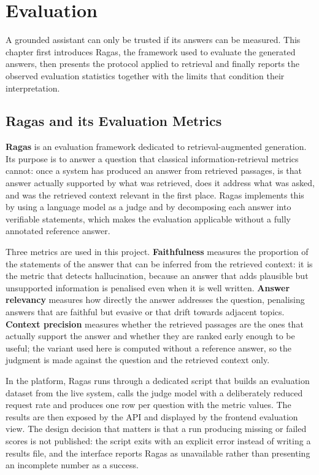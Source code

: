 \chapter{Evaluation}
\label{chap:evaluation}

A grounded assistant can only be trusted if its answers can be measured. This chapter first introduces Ragas, the framework used to evaluate the generated answers, then presents the protocol applied to retrieval and finally reports the observed evaluation statistics together with the limits that condition their interpretation.

\section{Ragas and its Evaluation Metrics}
\label{sec:ragas}
\textbf{Ragas} is an evaluation framework dedicated to retrieval-augmented generation. Its purpose is to answer a question that classical information-retrieval metrics cannot: once a system has produced an answer from retrieved passages, is that answer actually supported by what was retrieved, does it address what was asked, and was the retrieved context relevant in the first place. Ragas implements this by using a language model as a judge and by decomposing each answer into verifiable statements, which makes the evaluation applicable without a fully annotated reference answer.

Three metrics are used in this project. \textbf{Faithfulness} measures the proportion of the statements of the answer that can be inferred from the retrieved context: it is the metric that detects hallucination, because an answer that adds plausible but unsupported information is penalised even when it is well written. \textbf{Answer relevancy} measures how directly the answer addresses the question, penalising answers that are faithful but evasive or that drift towards adjacent topics. \textbf{Context precision} measures whether the retrieved passages are the ones that actually support the answer and whether they are ranked early enough to be useful; the variant used here is computed without a reference answer, so the judgment is made against the question and the retrieved context only.

In the platform, Ragas runs through a dedicated script that builds an evaluation dataset from the live system, calls the judge model with a deliberately reduced request rate and produces one row per question with the metric values. The results are then exposed by the API and displayed by the frontend evaluation view. The design decision that matters is that a run producing missing or failed scores is not published: the script exits with an explicit error instead of writing a results file, and the interface reports Ragas as unavailable rather than presenting an incomplete number as a success.

